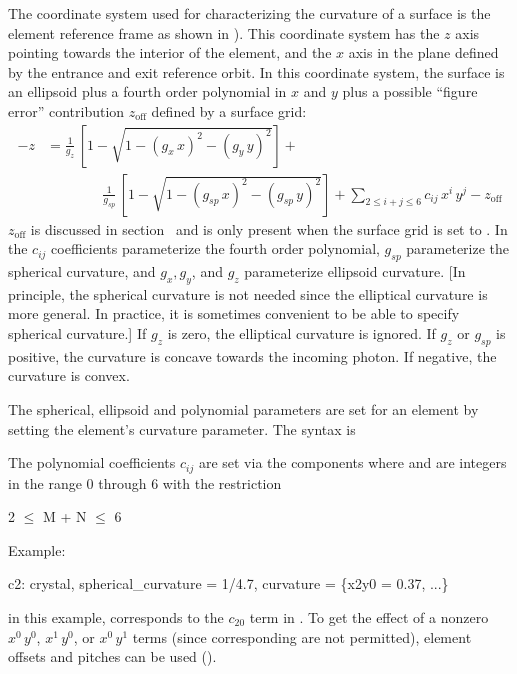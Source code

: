 The coordinate system used for characterizing the curvature of a surface is the element reference
frame as shown in ). This coordinate system has the $z$ axis pointing towards the
interior of the element, and the $x$ axis in the plane defined by the entrance and exit reference
orbit. In this coordinate system, the surface is an ellipsoid plus a fourth order polynomial in $x$
and $y$ plus a possible ``figure error'' contribution $z_\text{off}$ defined by a surface grid:
\begin{align}
  \label{xs2ij4}
  {-z} &= \frac{1}{g_z} \, \left[ 1 - \sqrt{1 - (g_x \, x)^2 - (g_y \, y)^2} \right] + \\
  &\qquad \qquad \frac{1}{g_{sp}} \, \left[ 1 - \sqrt{1 - (g_{sp} \, x)^2 - (g_{sp} \, y)^2} \right] + 
  \sum_{2 \le i+j \le 6} c_{ij} \, x^i \, y^j - z_\text{off} \nonumber
\end{align}
$z_\text{off}$ is discussed in section~ and is only present when the surface grid
 is set to . In  the $c_{ij}$ coefficients parameterize the
fourth order polynomial, $g_{sp}$ parameterize the spherical curvature, and $g_x, g_y$, and $g_z$
parameterize ellipsoid curvature. [In principle, the spherical curvature is not needed since the
elliptical curvature is more general. In practice, it is sometimes convenient to be able to specify
spherical curvature.]  If $g_z$ is zero, the elliptical curvature is ignored. If $g_z$ or $g_{sp}$
is positive, the curvature is concave towards the incoming photon. If negative, the curvature is
convex. 

The spherical, ellipsoid and polynomial parameters are set for an element by setting the element's
curvature parameter. The syntax is

The polynomial coefficients $c_{ij}$ are set via the  components where  and 
are integers in the range 0 through 6 with the restriction
\begin{example}
  2 \(\le\) M + N \(\le\) 6
\end{example}
Example:
\begin{example}
  c2: crystal, spherical_curvature = 1/4.7, curvature = \{x2y0 = 0.37, ...\}
\end{example}
in this example,  corresponds to the $c_{20}$ term in . To get the
effect of a nonzero $x^0\, y^0$, $x^1 \, y^0$, or $x^0 \, y^1$ terms (since corresponding
  are not permitted), element offsets and pitches can be used ().

